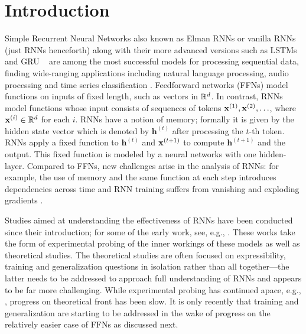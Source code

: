 \section{Introduction}
Simple Recurrent Neural Networks \cite{Elman} also known as Elman RNNs or vanilla RNNs (just RNNs henceforth) along with their more advanced versions such as LSTMs \cite{LSTM} and GRU ~\cite{cho-etal-2014-learning} are among the most successful models for processing sequential data, finding wide-ranging applications including natural language processing, audio processing \cite{jurafsky_martin} and time series classification \cite{lim2020time}. Feedforward networks (FFNs) model functions on inputs of fixed length, such as vectors in $\mathbb{R}^d$. In contrast, RNNs model functions whose input consists of sequences of tokens $\mathbf{x}^{(1)}, \mathbf{x}^{(2)}, \ldots$, where $\mathbf{x}^{(i)} \in \mathbb{R}^d$ for each $i$. 
 RNNs have a notion of memory; formally it is given by the hidden state vector which is denoted by $\mathbf{h}^{(t)}$ after processing the $t$-th token. RNNs apply a fixed function to $\mathbf{h}^{(t)}$ and $\mathbf{x}^{(t+1)}$ to compute $\mathbf{h}^{(t+1)}$ and the output. This fixed function is modeled by a neural networks with one hidden-layer. Compared to FFNs, new challenges arise in the analysis of RNNs: for example, the use of memory and the same function at each step introduces dependencies across time and RNN training suffers from vanishing and exploding gradients \cite{pascanu13}. 

Studies aimed at understanding the effectiveness of RNNs have been conducted since their introduction; for some of the early work, see, e.g., \cite{SiegelmannS95, kolen2001field}. These works take the form of experimental probing of the inner workings of these models as well as theoretical studies. 
The theoretical studies are often focused on expressibility, training and generalization questions in isolation rather than all together---the latter needs to be addressed to approach full understanding of RNNs and appears to be far more challenging. While experimental probing has continued apace, e.g., \cite{WeissGY18, BhattamishraAG20}, progress on theoretical front has been slow. It is only recently that training and generalization are starting to be addressed in the wake of progress on the relatively easier case of FFNs as discussed next.

